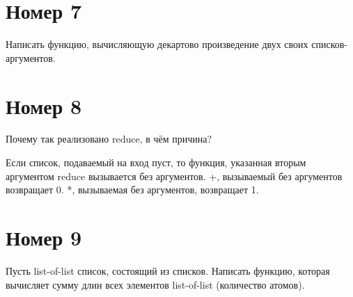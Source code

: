 \section{Номер 7}

Написать функцию, вычисляющую декартово произведение двух своих списков-аргументов.

\begin{figure}[H]
    \begin{listingbox}{}
        
    \end{listingbox}
    \label{lst:7}
\end{figure}

\section{Номер 8}

Почему так реализовано reduce, в чём причина?

\begin{figure}[H]
    \begin{listingbox}{}
        
    \end{listingbox}
    \label{lst:8}
\end{figure}

Если список, подаваемый на вход пуст, то функция, указанная вторым 
аргументом reduce вызывается без аргументов. +, вызываемый без аргументов
возвращает 0. *, вызываемая без аргументов, возвращает 1.

\section{Номер 9}

Пусть list-of-list список, состоящий из списков. Написать функцию, которая 
вычисляет сумму длин всех элементов list-of-list (количество атомов).

\begin{figure}[H]
    \begin{listingbox}{}
        
    \end{listingbox}
    \label{lst:9}
\end{figure}